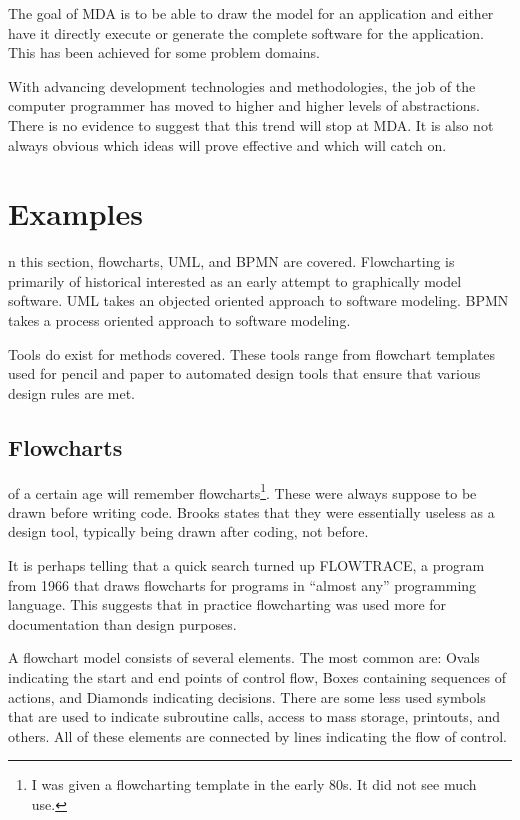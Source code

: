 \documentclass[10pt,journal,letterpaper,compsoc]{IEEEtran}
\begin{document}
The goal of MDA is to be able to draw the model for an application and either have it directly execute or generate the complete software for the application.  This has been achieved for some problem domains\cite{Mellor2007}.

With advancing development technologies and methodologies, the job of the computer programmer has moved to higher and higher levels of abstractions.  There is no evidence to suggest that this trend will stop at MDA.  It is also not always obvious which ideas will prove effective and which will catch on.

\section{Examples}

n this section, flowcharts, UML, and BPMN are covered.  Flowcharting is primarily of historical interested as an early attempt to graphically model software.  UML takes an objected oriented approach to software modeling.  BPMN takes a process oriented approach to software modeling.

Tools do exist for methods covered.  These tools range from flowchart templates used for pencil and paper to automated design tools that ensure that various design rules are met.

\subsection{Flowcharts}
 of a certain age will remember flowcharts\footnote{I was given a flowcharting template in the early 80s.  It did not see much use.}.  These were always suppose to be drawn before writing code.  Brooks\cite{Brooks1995} states that they were essentially useless as a design tool, typically being drawn after coding, not before.

It is perhaps telling that a quick search turned up FLOWTRACE\cite{Sherman1966}, a program from 1966 that draws flowcharts for programs in ``almost any'' programming language.  This suggests that in practice flowcharting was used more for documentation than design purposes.

A flowchart model consists of several elements.  The most common are: Ovals indicating the start and end points of control flow,  Boxes containing sequences of actions, and  Diamonds indicating decisions.  There are some less used symbols that are used to indicate subroutine calls, access to mass storage, printouts, and others.  All of these elements are connected by lines indicating the flow of control.
\end{document}

